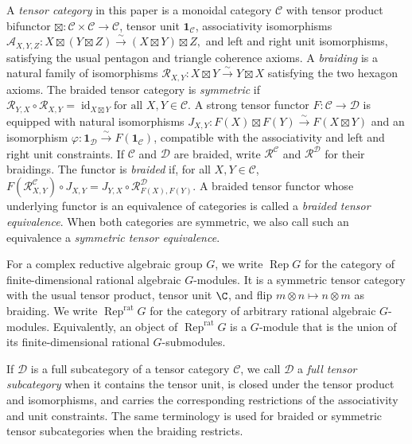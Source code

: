 \documentclass[12pt,leqno]{amsart}
\numberwithin{equation}{section} \newtheorem{thm}{Theorem}[section] \newtheorem{lem}[thm]{Lemma} \newtheorem{ex}[thm]{Example} \newtheorem{prop}[thm]{Proposition} \newtheorem{cor}[thm]{Corollary} \newtheorem{defi}[thm]{Definition} \newtheorem{rmk}[thm]{Remark} \newtheorem{notation}[thm]{Notation}
\newcommand{\id}{\operatorname{id}}
\newcommand{\Rep}{\operatorname{Rep}}
\begin{document}
A \emph{tensor category} in this paper is a monoidal category $\mathcal C$ with tensor product bifunctor \(\boxtimes:\mathcal C\times\mathcal C\longrightarrow\mathcal C\), tensor unit $\mathbf 1_{\mathcal C}$, associativity isomorphisms \(\mathcal A_{X,Y,Z}:X\boxtimes(Y\boxtimes Z)\overset{\sim}{\longrightarrow}(X\boxtimes Y)\boxtimes Z,\) and left and right unit isomorphisms, satisfying the usual pentagon and triangle coherence axioms. A \emph{braiding} is a natural family of isomorphisms \(\mathcal R_{X,Y}:X\boxtimes Y\overset{\sim}{\longrightarrow}Y\boxtimes X\) satisfying the two hexagon axioms. The braided tensor category is \emph{symmetric} if \(\mathcal R_{Y,X}\circ\mathcal R_{X,Y}=\id_{X\boxtimes Y}\text{for all }X,Y\in\mathcal C.\) A strong tensor functor $F:\mathcal C\to\mathcal D$ is equipped with natural isomorphisms \(J_{X,Y}:F(X)\boxtimes F(Y)\overset{\sim}{\longrightarrow}F(X\boxtimes Y)\) and an isomorphism \(\varphi:\mathbf 1_{\mathcal D}\overset{\sim}{\longrightarrow}F(\mathbf 1_{\mathcal C})\), compatible with the associativity and left and right unit constraints. If $\mathcal C$ and $\mathcal D$ are braided, write $\mathcal R^{\mathcal C}$ and $\mathcal R^{\mathcal D}$ for their braidings. The functor is \emph{braided} if, for all $X,Y\in\mathcal C$, \(F(\mathcal R^{\mathcal C}_{X,Y})\circ J_{X,Y}=J_{Y,X}\circ\mathcal R^{\mathcal D}_{F(X),F(Y)}.\) A braided tensor functor whose underlying functor is an equivalence of categories is called a \emph{braided tensor equivalence}. When both categories are symmetric, we also call such an equivalence a \emph{symmetric tensor equivalence}.

For a complex reductive algebraic group $G$, we write $\Rep G$ for the category of finite-dimensional rational algebraic $G$-modules. It is a symmetric tensor category with the usual tensor product, tensor unit $\C$, and flip \(m\otimes n\longmapsto n\otimes m\) as braiding. We write $\Rep^{\mathrm{rat}}G$ for the category of arbitrary rational algebraic $G$-modules. Equivalently, an object of $\Rep^{\mathrm{rat}}G$ is a $G$-module that is the union of its finite-dimensional rational $G$-submodules.

If $\mathcal D$ is a full subcategory of a tensor category $\mathcal C$, we call $\mathcal D$ a \emph{full tensor subcategory} when it contains the tensor unit, is closed under the tensor product and isomorphisms, and carries the corresponding restrictions of the associativity and unit constraints. The same terminology is used for braided or symmetric tensor subcategories when the braiding restricts.
\end{document}

